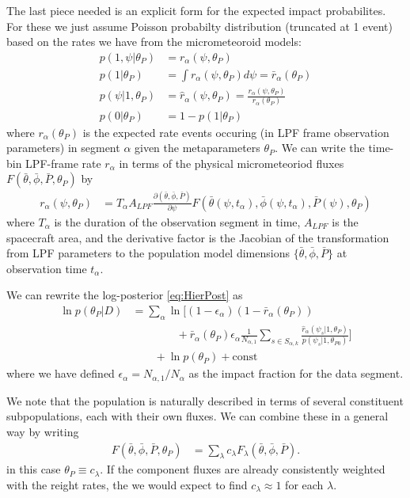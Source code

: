 \documentclass[twocolumn,showpacs,aps,prd,nobibnotes,nofootinbib,floatfix]{revtex4-1}
\begin{document}
The last piece needed is an explicit form for the expected impact probabilites.  For these we just assume Poisson probabilty distribution (truncated at 1 event) based on the rates we have from the micrometeoroid models:
\begin{align*}
  p(1,\psi|\theta_P)&=r_\alpha(\psi,\theta_P)\\
  p(1|\theta_P)&=\int r_\alpha(\psi,\theta_P)d\psi = \bar r_\alpha(\theta_P)\\
  p(\psi|1,\theta_P)&=\hat r_\alpha(\psi,\theta_P)=\frac{r_\alpha(\psi,\theta_P)}{r_\alpha(\theta_P)}\\
  p(0|\theta_P)&=1-p(1|\theta_P)
\end{align*}
where $r_\alpha(\theta_P)$ is the expected rate events occuring (in LPF frame observation parameters) in segment $\alpha$ given the metaparameters $\theta_P$.  We can write the time-bin LPF-frame rate $r_\alpha$ in terms of the physical micrometeoriod fluxes $F(\bar\theta,\bar\phi,\bar P,\theta_P)$ by
\begin{align}
  r_\alpha(\psi,\theta_P)&=T_\alpha A_{LPF}\frac{\partial(\bar\theta,\bar\phi,\bar P)}{\partial\psi}F(\bar\theta(\psi,t_\alpha),\bar\phi(\psi,t_\alpha),\bar P(\psi),\theta_P)
\end{align}
where $T_\alpha$ is the duration of the observation segment in time, $A_{LPF}$ is the spacecraft area, and the derivative factor is the Jacobian of the transformation from LPF parameters to the population model dimensions $\{\bar\theta,\bar\phi,\bar P\}$ at observation time $t_\alpha$.

We can rewrite the log-posterior \eqref{eq:HierPost} as 
\begin{align}
  \ln p(\theta_P|D)&= \sum_\alpha\ln\Big[ (1-\epsilon_\alpha)(1-\bar r_\alpha(\theta_P))\nonumber\\
    &\qquad\qquad+\bar r_\alpha(\theta_P)\epsilon_\alpha \frac1{N_{\alpha,1}}\sum_{s\in S_{\alpha,k}}\frac{\hat r_\alpha(\psi_s|1,\theta_P)}{p(\psi_s|1,\theta_{P0})}\Big]\nonumber\\
  &\qquad+\ln p(\theta_P)+\mathrm{const}\label{eq:HierPostB}
\end{align}
where we have defined $\epsilon_\alpha=N_{\alpha,1}/N_\alpha$ as the impact fraction for the data segment.

We note that the population is naturally described in terms of several constituent subpopulations, each with their own fluxes.  We can combine these in a general way by writing
\begin{align}
  F(\bar\theta,\bar\phi,\bar P,\theta_P)&=\sum_{\lambda} c_\lambda F_\lambda(\bar\theta,\bar\phi,\bar P).\nonumber
\end{align}
in this case $\theta_P\equiv{c_\lambda}$.  If the component fluxes are already consistently weighted with the reight rates, the we would expect to find $c_\lambda\approx1$ for each $\lambda$.
\end{document}
